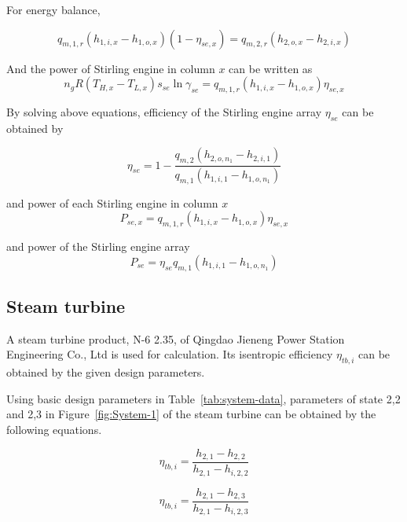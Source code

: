 \documentclass{article}
\begin{document}
For energy balance,

\begin{equation*}
	q_{m,1,r}(h_{1,i,x}-h_{1,o,x})(1-\eta_{se,x})=q_{m,2,r}(h_{2,o,x}-h_{2,i,x})
\end{equation*}

And the power of Stirling engine in column $x$ can be written as 
\begin{equation*}
		n_gR\left(T_{H,x}-T_{L,x}\right)s_{se}\ln\gamma_{se} = q_{m,1,r}(h_{1,i,x}-h_{1,o,x})\eta_{se,x}
\end{equation*}

By solving above equations, efficiency of the Stirling engine array $\eta_{se}$ can be obtained by

\begin{equation*}
	\eta_{se}=1-\dfrac{q_{m,2}(h_{2,o,n_1}-h_{2,i,1})}{q_{m,1}(h_{1,i,1}-h_{1,o,n_1})}\label{eq:eta_stirling-1}
\end{equation*}


and power of each Stirling engine in column $x$
\begin{equation*}
	P_{se,x}=q_{m,1,r}(h_{1,i,x}-h_{1,o,x})\eta_{se,x}
\end{equation*}


and power of the Stirling engine array
\begin{equation*}
	P_{se}=\eta_{se}q_{m,1}(h_{1,i,1}-h_{1,o,n_1})
\end{equation*}

\subsection{Steam turbine}

A steam turbine product, N-6 2.35, of Qingdao Jieneng Power Station Engineering Co., Ltd is used for calculation. Its isentropic efficiency $\eta_{tb,i}$ can be obtained by the given design parameters.

Using basic design parameters in Table~\ref{tab:system-data}, parameters of state 2,2 and 2,3 in Figure~\ref{fig:System-1} of the steam turbine can be obtained by the following equations.

\begin{equation*}
	\eta_{tb,i}=\frac{h_{2,1}-h_{2,2}}{h_{2,1}-h_{i,2,2}}
\end{equation*}

\begin{equation*}
	\eta_{tb,i}=\frac{h_{2,1}-h_{2,3}}{h_{2,1}-h_{i,2,3}}
\end{equation*}
\end{document}
